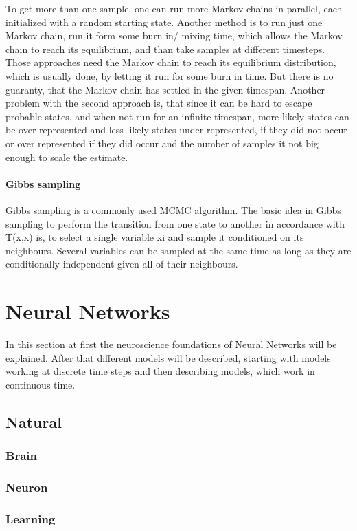 To get more than one sample, one can run more Markov chains in parallel, each initialized with a random starting state. 
Another method is to run just one Markov chain, run it form some burn in/ mixing time, which allows the Markov chain to reach its equilibrium, and than take samples at different timesteps.
Those approaches need the Markov chain to reach its equilibrium distribution, which is usually done, by letting it run for some burn in time.
But there is no guaranty, that the Markov chain has settled in the given timespan.    
Another problem with the second approach is, that since it can be hard to escape probable states, and when not run for an infinite timespan, more likely states can be over represented and less likely states under represented, if they did not occur or over represented if they did occur and the number of samples it not big enough to scale the estimate.  

\paragraph{Gibbs sampling} Gibbs sampling is a commonly used MCMC algorithm. The basic idea in Gibbs sampling to perform the transition from one state to another in accordance with T(x,x) is, to select a single variable xi and sample it conditioned on its neighbours. 
Several variables can be sampled at the same time as long as they are conditionally independent given all of their neighbours.

\section{Neural Networks}

In this section at first the neuroscience foundations of Neural Networks will be explained.
After that different models will be described, starting with models working at discrete time steps and then describing models, which work in continuous time. 

\subsection{Natural}
\subsubsection{Brain}
\subsubsection{Neuron}
\subsubsection{Learning}

